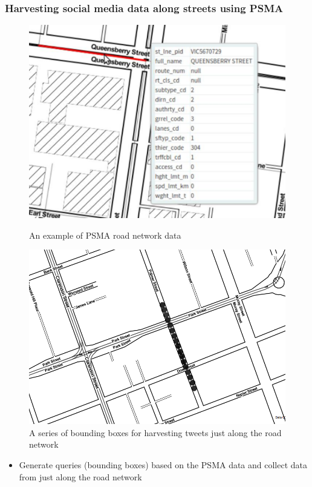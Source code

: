 \begin{frame}
    \frametitle{Harvesting social media data along streets using PSMA}

    \begin{figure}[h]
       \begin{minipage}{0.49\textwidth}
         \centering
         \includegraphics[width=.8\linewidth]{resource/figures/psma_data.png}
         \caption{An example of PSMA road network data}\label{fig:psma}
       \end{minipage}\hfill
       \begin{minipage}{0.49\textwidth}
         \centering
         \includegraphics[width=.8\linewidth]{resource/figures/harvest_tweets_along_street.png}
         \caption{A series of bounding boxes for harvesting tweets just along the road network}\label{fig:harvest_along_street}
       \end{minipage}
    \end{figure}

    \begin{itemize}
	    \item Generate queries (bounding boxes) based on the PSMA data and collect data from just along the road network
    \end{itemize}
\end{frame}

